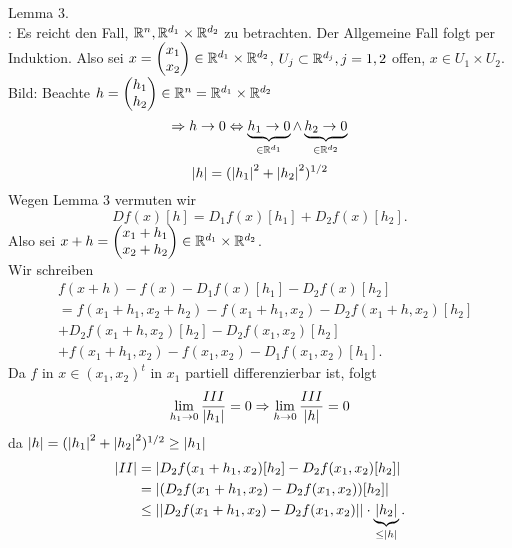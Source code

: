 \documentclass[../ana2.tex]{subfiles}
\begin{document}
\begin{bew}
    \gqq{\( \Rightarrow \)} Lemma 3.\\
    \gqq{\( \Leftrightarrow \)}: Es reicht den Fall, \( \mathbb{R}^n, \mathbb{R}^{d_1} \times \mathbb{R}^{d_2} \) 
    zu betrachten. Der Allgemeine Fall folgt per Induktion. 
    Also sei \( x = \begin{pmatrix} x_1 \\ x_2 \end{pmatrix} \in \mathbb{R}^{d_1} \times \mathbb{R}^{d_2} \), 
    \( U_j \subset \mathbb{R}^{d_j}, j = 1,2 \) offen, \( x \in U_1 \times U_2 \). 
    Bild: 
    Beachte \(h = \begin{pmatrix}
        h_1 \\
        h_2
    \end{pmatrix} \in \mathbb{R}^n = \mathbb{R}^{d_1} \times \mathbb{R}^{d_2} \)
    \[ \Rightarrow h \rightarrow 0 \Leftrightarrow 
    \underbrace{h_1 \rightarrow 0}_{\in \mathbb{R}^{d_1}}
    \wedge \underbrace{h_2 \rightarrow 0}_{\in \mathbb{R}^{d_2}} \]
    \[ \left|h\right| = (\left|h_1\right|^2 + \left|h_2\right|^2)^{1/2} \]
    Wegen Lemma 3 vermuten wir 
    \[ Df(x)[h] = D_1f(x)[h_1] + D_2f(x)[h_2]. \]
    Also sei \( x + h = 
    \begin{pmatrix} x_1 + h_1 \\ x_2 + h_2 \end{pmatrix} 
    \in \mathbb{R}^{d_1} \times \mathbb{R}^{d_2} \).\\
    Wir schreiben 
    \begin{align*}
        &f(x + h) - f(x) - D_1f(x)[h_1] - D_2 f(x)[h_2] \\
        &= f(x_1 + h_1, x_2 + h_2) - f(x_1 + h_1, x_2) 
        - D_2 f(x_1 + h, x_2)[h_2] \tag{I}\\ 
        &+ D_2 f(x_1 + h, x_2)[h_2] - D_2 f(x_1, x_2)[h_2] \tag{II} \\
        &+ f(x_1 + h_1, x_2) - f(x_1, x_2) - D_1 f(x_1, x_2)[h_1] \tag{III}.
    \end{align*}
    Da \(f\) in \(x \in (x_1, x_2)^t\) in \(x_1\) partiell 
    differenzierbar ist, folgt 
    \[ \lim\limits_{h_1\rightarrow{}0} \frac{III}{\left|h_1\right|} = 0 \Rightarrow
    \lim\limits_{h\rightarrow{}0} \frac{III}{\left|h\right|} = 0 \]
    da \( \left|h\right| = (\left|h_1\right|^2 + \left|h_2\right|^2)^{1/2} \geq \left|h_1\right| \)
    \begin{align*}
        \abs{II} &= \abs{ D_2 f(x_1 + h_1, x_2)[h_2] - D_2 f(x_1, x_2)[h_2] } \\
        &= \abs{ (D_2 f(x_1 + h_1, x_2) - D_2 f(x_1, x_2))[h_2] }\\
        &\leq \norm{ D_2 f(x_1 + h_1, x_2) - D_2 f(x_1, x_2) } \cdot \underbrace{\abs{h_2}}_{\leq \abs{h}}.

\end{align*}
\end{bew}
\end{document}
